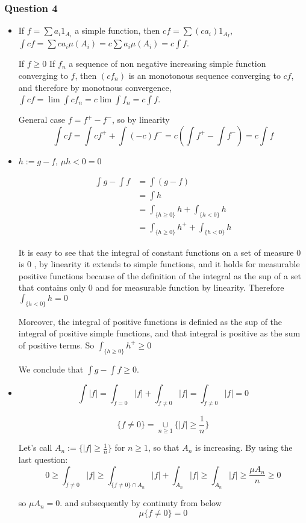 \documentclass[12pt]{article}
\newcommand{\Q}[1]{\subsubsection*{Question #1}}
\newcommand{\union}[1]{\underset{#1}{\cup} }
\newcommand{\inter}[1]{\underset{#1}{\cap} }
\begin{document}
\Q{4}
\begin{itemize}
\item
If $f = \sum a_i 1_{A_i}$ a simple function, then $cf = \sum (c a_i) 1_{A_I}$, $\int c f = \sum c a_i \mu(A_i) = c \sum a_i \mu(A_i) = c \int f$.



If $f \geq 0$
If $f_n$ a sequence of non negative increasing simple function converging to $f$, then $(c f_n)$ is an monotonous sequence converging to $c f$, and therefore by monotnous convergence, $\int c f = \lim \int c f_n = c \lim \int f_n = c \int f$.

General case $f = f^+ - f^-$, so by linearity $$\int cf = \int c f^+ + \int (-c) f^- = c(\int f^+ - \int  f^-) = c \int f$$

\item $h := g-f$, $\mu{h < 0} = 0$

\begin{align*}
\int g - \int f  &= \int (g-f)  \\
&= \int h \\
&= \int_{\{h \geq 0\}} h + \int_{\{h < 0\}} h \\
&= \int_{\{h \geq 0\}} h^+ + \int_{\{h < 0\}} h
\end{align*}

It is easy to see that the integral of constant functions on a set of measure $0$ is $0$ , by linearity it extends to simple functions, and it holds for measurable positive functions because of the definition of the integral as the sup of a set that contains only $0$ and for measurable function by linearity. Therefore $\int_{\{h < 0\}} h = 0$


Moreover, the integral of positive functions is definied as the sup of the integral of positive simple functions, and that integral is positive as the sum of positive terms. So $\int_{\{h \geq 0\}} h^+ \geq 0$

We conclude that $\int g - \int f \geq 0$.


\item 
$$\int |f| = \int_{f = 0} |f| + \int_{f \neq 0} |f| = \int_{f \neq 0} |f| = 0$$

$$\{f \neq 0\} = \union{n \geq 1} \{ |f| \geq \frac1 n\}$$

Let's call $A_n := \{ |f| \geq \frac1 n\}$ for $n \geq 1$, so that $A_n$ is increasing. By using the last question:
$$ 0 \geq \int_{f \neq 0} |f| \geq  \int_{\{f \neq 0\} \inter{} A_n} |f| + \int_{A_n} |f| \geq  \int_{A_n} |f| \geq \frac{\mu A_n}{n} \geq 0$$

so $\mu A_n = 0$. and subsequently by continuty from below $$\mu \{f \neq 0\} = 0$$

\end{itemize}
\end{document}
